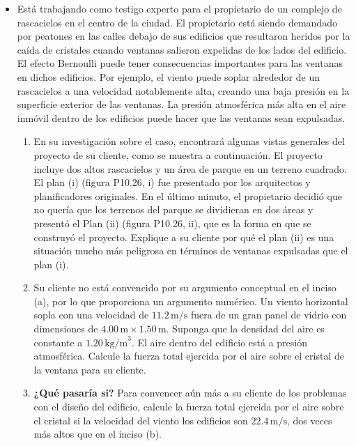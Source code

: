 \documentclass[11pt,a4paper]{article}
\begin{document}
\begin{itemize}
    \item[\textbf{26.}] Está trabajando como testigo experto para el propietario de un complejo de rascacielos en el centro de la ciudad. El propietario está siendo demandado por peatones en las calles debajo de sus edificios que resultaron heridos por la caída de cristales cuando ventanas salieron expelidas de los lados del edificio. El efecto Bernoulli puede tener consecuencias importantes para las ventanas en dichos edificios. Por ejemplo, el viento puede soplar alrededor de un rascacielos a una velocidad notablemente alta, creando una baja presión en la superficie exterior de las ventanas. La presión atmosférica más alta en el aire inmóvil dentro de los edificios puede hacer que las ventanas sean expulsadas.
    \begin{enumerate}
        \item En su investigación sobre el caso, encontrará algunas vistas generales del proyecto de su cliente, como se muestra a continuación. El proyecto incluye dos altos rascacielos y un área de parque en un terreno cuadrado. El plan (i) (figura P10.26, i) fue presentado por los arquitectos y planificadores originales. En el último minuto, el propietario decidió que no quería que los terrenos del parque se dividieran en dos áreas y presentó el Plan (ii) (figura P10.26, ii), que es la forma en que se construyó el proyecto. Explique a su cliente por qué el plan (ii) es una situación mucho más peligrosa en términos de ventanas expulsadas que el plan (i).
        \item Su cliente no está convencido por su argumento conceptual en el inciso (a), por lo que proporciona un argumento numérico. Un viento horizontal sopla con una velocidad de \(11.2\,\text{m/s}\) fuera de un gran panel de vidrio con dimensiones de \(4.00\,\text{m} \times 1.50\,\text{m}\). Suponga que la densidad del aire es constante a \(1.20\,\text{kg/m}^3\). El aire dentro del edificio está a presión atmosférica. Calcule la fuerza total ejercida por el aire sobre el cristal de la ventana para su cliente.
        \item \textbf{¿Qué pasaría si?} Para convencer aún más a su cliente de los problemas con el diseño del edificio, calcule la fuerza total ejercida por el aire sobre el cristal si la velocidad del viento los edificios son \(22.4\,\text{m/s}\), dos veces más altos que en el inciso (b).
    \end{enumerate}
    
    \vspace*{9cm}
\end{itemize}
\end{document}
